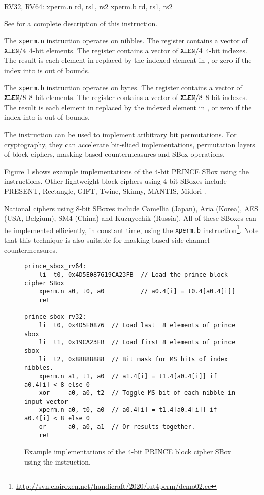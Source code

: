 \begin{cryptobitmanipisa}
RV32, RV64:
    xperm.n rd, rs1, rs2
    xperm.b rd, rs1, rs2
\end{cryptobitmanipisa}

See \cite[Section 2.2.4]{riscv:bitmanip:draft} for a complete
description of this instruction.

The {\tt xperm.n} instruction operates on nibbles.
The \rsone register contains a vector of ${\tt XLEN}/4$ $4$-bit elements.
The \rstwo register contains a vector of ${\tt XLEN}/4$ $4$-bit indexes.
The result is each element in \rstwo replaced by the indexed element
in \rsone, or zero if the index into \rstwo is out of bounds.

The {\tt xperm.b} instruction operates on bytes.
The \rsone register contains a vector of ${\tt XLEN}/8$ $8$-bit elements.
The \rstwo register contains a vector of ${\tt XLEN}/8$ $8$-bit indexes.
The result is each element in \rstwo replaced by the indexed element
in \rsone, or zero if the index into \rstwo is out of bounds.

The instruction can be used to implement aribitrary bit
permutations.
For cryptography, they can accelerate bit-sliced implementations,
permutation layers of block ciphers, masking based countermeasures
and SBox operations.

Figure \ref{fig:example:xperm} shows example implementations of the
$4$-bit PRINCE SBox using the instructions.
Other lightweight block ciphers using $4$-bit SBoxes include
PRESENT\cite{block:present},
Rectangle\cite{block:rectangle},
GIFT\cite{block:gift},
Twine\cite{block:twine},
Skinny, MANTIS\cite{block:skinny},
Midori \cite{block:midori}.

National ciphers using $8$-bit SBoxes include
Camellia\cite{block:camellia} (Japan), 
Aria\cite{block:aria} (Korea),
AES\cite{nist:fips:197} (USA, Belgium),
SM4\cite{block:sm4:1} (China)
and Kuznyechik (Russia).
All of these SBoxes can be implemented efficiently, in constant
time, using the {\tt xperm.b} instruction\footnote{
    \url{http://svn.clairexen.net/handicraft/2020/lut4perm/demo02.cc}
}.
Note that this technique is also suitable for masking based
side-channel countermeasures.

\begin{figure}[h]
\begin{lstlisting}[style=ASM]
prince_sbox_rv64:
    li  t0, 0x4D5E087619CA23FB  // Load the prince block cipher SBox
    xperm.n a0, t0, a0          // a0.4[i] = t0.4[a0.4[i]]
    ret

prince_sbox_rv32:
    li  t0, 0x4D5E0876  // Load last  8 elements of prince sbox
    li  t1, 0x19CA23FB  // Load first 8 elements of prince sbox
    li  t2, 0x88888888  // Bit mask for MS bits of index nibbles.
    xperm.n a1, t1, a0  // a1.4[i] = t1.4[a0.4[i]] if a0.4[i] < 8 else 0
    xor     a0, a0, t2  // Toggle MS bit of each nibble in input vector
    xperm.n a0, t0, a0  // a0.4[i] = t1.4[a0.4[i]] if a0.4[i] < 8 else 0
    or      a0, a0, a1  // Or results together.
    ret
\end{lstlisting}
\caption{
    Example implementations of the $4$-bit PRINCE\cite{block:prince}
    block cipher SBox using the  instruction.
}
\label{fig:example:xperm}
\end{figure}
